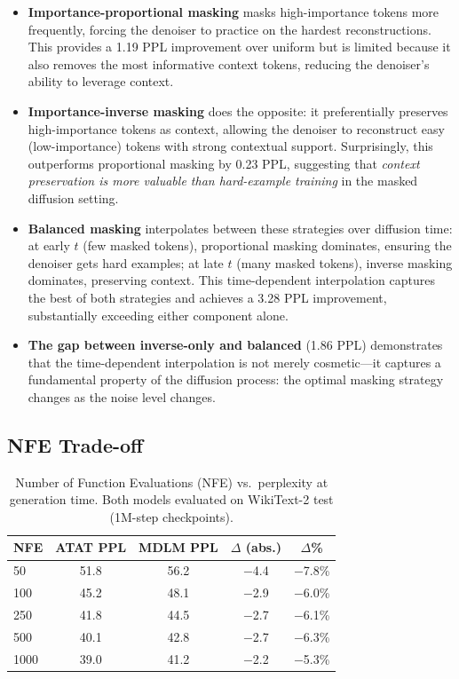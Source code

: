 \begin{itemize}[leftmargin=*,itemsep=2pt]
    \item \textbf{Importance-proportional masking} masks high-importance tokens more frequently, forcing the denoiser to practice on the hardest reconstructions. This provides a 1.19 PPL improvement over uniform but is limited because it also removes the most informative context tokens, reducing the denoiser's ability to leverage context.
    
    \item \textbf{Importance-inverse masking} does the opposite: it preferentially preserves high-importance tokens as context, allowing the denoiser to reconstruct easy (low-importance) tokens with strong contextual support. Surprisingly, this outperforms proportional masking by 0.23 PPL, suggesting that \emph{context preservation is more valuable than hard-example training} in the masked diffusion setting.
    
    \item \textbf{Balanced masking} interpolates between these strategies over diffusion time: at early $t$ (few masked tokens), proportional masking dominates, ensuring the denoiser gets hard examples; at late $t$ (many masked tokens), inverse masking dominates, preserving context. This time-dependent interpolation captures the best of both strategies and achieves a 3.28 PPL improvement, substantially exceeding either component alone.
    
    \item \textbf{The gap between inverse-only and balanced} (1.86 PPL) demonstrates that the time-dependent interpolation is not merely cosmetic---it captures a fundamental property of the diffusion process: the optimal masking strategy changes as the noise level changes.
\end{itemize}

\subsection{NFE Trade-off}

\begin{table}[h]
\centering
\caption{Number of Function Evaluations (NFE) vs.\ perplexity at generation time. Both models evaluated on WikiText-2 test (1M-step checkpoints).}
\label{tab:nfe-full}
\begin{tabular}{lcccc}
\toprule
\textbf{NFE} & \textbf{ATAT PPL} & \textbf{MDLM PPL} & \textbf{$\Delta$ (abs.)} & \textbf{$\Delta$\%} \\
\midrule
50 & 51.8 & 56.2 & $-$4.4 & $-$7.8\% \\
100 & 45.2 & 48.1 & $-$2.9 & $-$6.0\% \\
250 & 41.8 & 44.5 & $-$2.7 & $-$6.1\% \\
500 & 40.1 & 42.8 & $-$2.7 & $-$6.3\% \\
1000 & 39.0 & 41.2 & $-$2.2 & $-$5.3\% \\
\bottomrule
\end{tabular}
\end{table}

